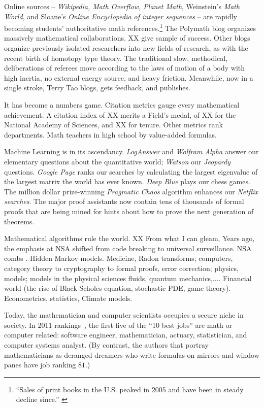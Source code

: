 \documentclass{llncs}
\begin{document}
Online sources -- {\it Wikipedia, Math Overflow, Planet Math},
Weinstein's {\it Math World}, and Sloane's {\it Online Encyclopedia of
  integer sequences} -- are rapidly becoming students' authoritative
math references.\footnote{``Sales of print books in the U.S. peaked in
  2005 and have been in steady decline since.'' \cite{XX Bill Keller,
    New York Times Magazine, p9.July 17, 2011}} The Polymath blog
organizes massively mathematical collaborations.  XX give sample of
success. Other blogs organize previously isolated researchers into new
fields of research, as with the recent birth\cite{XX
  http://homotopytypetheory.org/} of homotopy type theory.  The
traditional slow, methodical, deliberations of referees move according to the laws of motion
of a body with high inertia, no external energy source, and heavy friction. 
Meanwhile, now in a single stroke, Terry Tao blogs, gets
feedback, and publishes.

It has become a numbers game.  Citation metrics gauge every mathematical achievement.  A
citation index of XX merits a Field's medal, of XX for the National
Academy of Sciences, and XX for tenure.  Other metrics rank departments.  Math
teachers in high school by value-added formulas.

Machine Learning is in its ascendancy.  {\it LogAnswer} and {\it
  Wolfram Alpha} answer our elementary questions about the
quantitative world; {\it Watson} our {\it Jeopardy} questions. {\it
  Google Page} ranks our searches by calculating the largest eigenvalue of the largest matrix
the world has ever known.  {\it Deep Blue} plays our chess
games. The million dollar prize-winning {\it Pragmatic Chaos}
algorithm enhances our {\it Netflix searches}.  The major proof
assistants now contain tens of thousands of formal proofs that are
being mined for hints about how to prove the next generation of
theorems.


Mathematical algorithms rule the world. XX From what I can gleam,
Years ago, the emphasis at NSA shifted from code breaking to universal
surveillance. NSA combs .  Hidden Markov models.  Medicine, Radon
transforms; computers, category theory to cryptography to formal
proofs, error correction; physics, models; models in the physical
sciences fluids, quantum mechanics,....  Financial world (the rise of
Black-Scholes equation, stochastic PDE, game theory). Econometrics,
statistics, Climate models.

Today, the mathematician and computer scientists occupies a secure
niche in society.  In 2011 rankings~\cite{XX Career Cast}, the first
five of the ``10 best jobs'' are math or computer related: software
engineer, mathematician, actuary, statistician, and computer systems
analyst.  (By contrast, the authors that portray mathematicians as
deranged dreamers who write formulas on mirrors and window panes have
job ranking $81$.)
\end{document}
